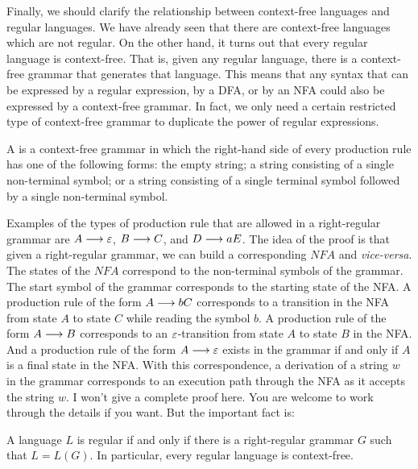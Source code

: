 Finally, we should clarify the relationship between context-free
languages and regular languages.  We have already seen that
there are context-free languages which are not regular.
On the other hand, it turns out that every regular language
is context-free.  That is, given any regular language, there
is a context-free grammar that generates that language.  This
means that any syntax that can be expressed by a regular expression,
by a DFA, or by an NFA could also be expressed by a context-free
grammar.  In fact, we only need a certain restricted type of
context-free grammar to duplicate the power of regular expressions.

\begin{definition}
A  is a context-free 
grammar in which the right-hand side of every production
rule has one of the following forms:  the empty string;
a string consisting of a single non-terminal symbol; or
a string consisting of a single terminal symbol followed
by a single non-terminal symbol.
\end{definition}

Examples of the types of production rule that are allowed in
a right-regular grammar are $A\longrightarrow\varepsilon$,
$B\longrightarrow C$, and $D\longrightarrow aE$.  The idea of the
proof is that given a right-regular grammar, we can build
a corresponding $NFA$ and \textit{vice-versa}.  The
states of the $NFA$ correspond to the non-terminal symbols
of the grammar.  The start symbol of the grammar corresponds
to the starting state of the NFA.
A production rule of the form $A\longrightarrow bC$
corresponds to a transition in the NFA from state $A$ to state
$C$ while reading the symbol $b$.  A production rule of
the form $A\longrightarrow B$ corresponds to an $\varepsilon$-transition
from state $A$ to state $B$ in the NFA.  And a production
rule of the form $A\longrightarrow\varepsilon$ exists in the grammar
if and only if $A$ is a final state in the NFA.  With this
correspondence, a derivation of a string $w$ in the grammar
corresponds to an execution path through the NFA as it 
accepts the string $w$.  I won't give a complete proof
here.  You are welcome to work through the details if you want.
But the important fact is:

\begin{theorem}\label{T-reggram}
A language $L$ is regular if and only if there is a right-regular
grammar $G$ such that $L=L(G)$.  In particular, every regular
language is context-free.
\end{theorem}


